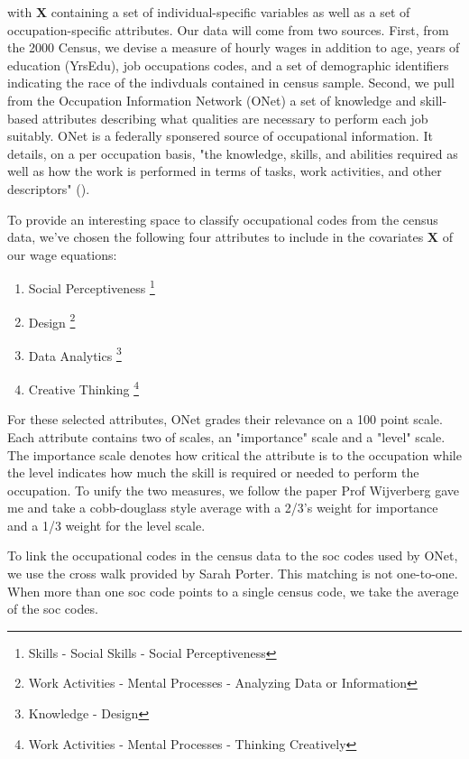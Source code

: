 \documentclass[12pt]{article}
\begin{document}
with $\boldsymbol{X}$ containing a set of individual-specific 
variables as well as a set of occupation-specific attributes. 
Our data will come from two sources. First, from the 2000 Census,
we devise a measure of hourly wages in addition to age,
years of education (YrsEdu), job occupations codes, 
and a set of demographic identifiers indicating the race of the
indivduals contained in census sample. Second, we pull from the
Occupation Information Network (ONet) a set of knowledge and skill-based
attributes describing what qualities are necessary to perform each
job suitably. ONet is a federally sponsered source of occupational
information. It details, on a per occupation basis, "the knowledge,
skills, and abilities required as well as how the work is
performed in terms of tasks, work activities, and other descriptors"
(\cite{ONET}). 

To provide an interesting space to classify occupational codes from
the census data, we've chosen the following four attributes to
include in the covariates $\boldsymbol{X}$ of our wage equations:

\begin{enumerate}
  \item Social Perceptiveness \footnote{Skills - Social Skills - Social Perceptiveness}
  \item Design \footnote{Work Activities - Mental Processes - Analyzing Data or Information}
  \item Data Analytics \footnote{Knowledge - Design}
  \item Creative Thinking \footnote{Work Activities - Mental Processes - Thinking Creatively}
\end{enumerate}

For these selected attributes, ONet grades their relevance on a
100 point scale. Each attribute contains two of scales, an "importance"
scale and a "level" scale. The importance scale denotes how critical the
attribute is to the occupation while the level indicates how much the
skill is required or needed to perform the occupation. To unify the two
measures, we follow the paper Prof Wijverberg gave me and take a
cobb-douglass style average with a 2/3's weight for importance and a 1/3
weight for the level scale.

To link the occupational codes in the census data to the soc codes used
by ONet, we use the cross walk provided by Sarah Porter. This matching
is not one-to-one. When more than one soc code points to a single census
code, we take the average of the soc codes.
\end{document}
